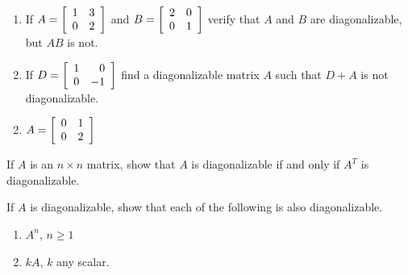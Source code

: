 \begin{multicols}{2}
\begin{ex}
\begin{sol}
\begin{enumerate}[label={\alph*.}]
\end{enumerate}
\end{sol}
\end{ex}

\begin{ex}
\begin{enumerate}[label={\alph*.}]
\item If $A = \left[ \begin{array}{rr}
1 & 3 \\
0 & 2 \end{array} \right]$
 and $B = \left[ \begin{array}{rr}
2 & 0 \\
0 & 1 
\end{array}\right]$
 verify that $A$ and $B$ are diagonalizable, but $AB$ is not.

\item If $D = \left[ \begin{array}{rr}
1 & 0 \\
0 & -1 
\end{array}\right]$
 find a diagonalizable matrix $A$ such that $D + A$ is not diagonalizable.

\end{enumerate}
\begin{sol}
\begin{enumerate}[label={\alph*.}]
\setcounter{enumi}{1}
\item  $A = \left[ \begin{array}{rr}
0 & 1 \\
0 & 2 
\end{array}\right]$ 


\end{enumerate}
\end{sol}
\end{ex}

\begin{ex}
If $A$ is an $n \times n$ matrix, show that $A$ is diagonalizable if and only if $A^{T}$ is diagonalizable.
\end{ex}

\begin{ex}
If $A$ is diagonalizable, show that each of the following is also diagonalizable.


\begin{enumerate}[label={\alph*.}]
\item $A^{n}$, $n \geq 1$

\item $kA$, $k$ any scalar.


\end{enumerate}
\end{ex}
\end{multicols}
